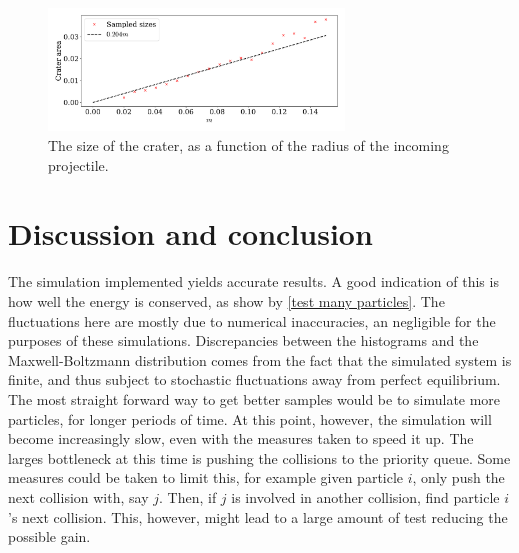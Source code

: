 \documentclass{article}
\begin{document}
    \begin{figure}[H]
        \centering
        \includegraphics[width=0.7\textwidth]{../plots/problem4/crater_size.pdf}
        \caption{The size of the crater, as a function of the radius of the incoming projectile.}
        \label{crater size}
    \end{figure}

    \section*{Discussion and conclusion}
    The simulation implemented yields accurate results.
    A good indication of this is how well the energy is conserved, as show by \autoref{test many particles}.
    The fluctuations here are mostly due to numerical inaccuracies, an negligible for the purposes of these simulations.
    Discrepancies between the histograms and the Maxwell-Boltzmann distribution comes from the fact that the simulated system is finite, and thus subject to stochastic fluctuations away from perfect equilibrium.
    The most straight forward way to get better samples would be to simulate more particles, for longer periods of time.
    At this point, however, the simulation will become increasingly slow, even with the measures taken to speed it up.
    The larges bottleneck at this time is pushing the collisions to the priority queue.
    Some measures could be taken to limit this, for example given particle $i$, only push the next collision with, say $j$.
    Then, if $j$ is involved in another collision, find particle $i$'s next collision.
    This, however, might lead to a large amount of test reducing the possible gain.
    
    \printbibliography
\end{document}
